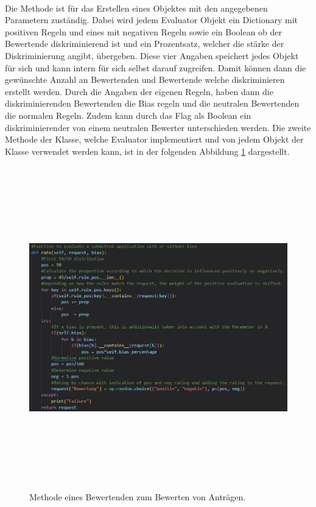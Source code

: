 \begin{onehalfspace}
\begin{figure}[h]
\end{figure}\\
Die Methode ist für das Erstellen eines Objektes mit den angegebenen Parametern zuständig. Dabei wird jedem \glqq{}Evaluator\grqq{} Objekt ein Dictionary mit positiven Regeln und eines mit negativen Regeln sowie ein Boolean ob der Bewertende diskriminierend ist und ein Prozentsatz, welcher die stärke der Diskriminierung angibt, übergeben. Diese vier Angaben speichert jedes Objekt für sich und kann intern für sich selbst darauf zugreifen. Damit können dann die gewünschte Anzahl an Bewertenden und Bewertende welche diskriminieren erstellt werden. Durch die Angaben der eigenen Regeln, haben dann die diskriminierenden Bewertenden die Bias regeln und die neutralen Bewertenden die normalen Regeln. Zudem kann durch das Flag als Boolean ein diskriminierender von einem neutralen Bewerter unterschieden werden.
Die zweite Methode der Klasse, welche \glqq{}Evaluator\grqq{} implementiert und von jedem Objekt der Klasse verwendet werden kann, ist in der folgenden Abbildung \ref{fig:Evaluator_rate} dargestellt.
\begin{figure}[h]
    \centering
    \includegraphics[width=16cm,height=14cm]{Diagramme/Evaluator_Rate.JPG}
    \caption{Methode eines Bewertenden zum Bewerten von Anträgen.}
    \label{fig:Evaluator_rate}

\end{figure}
\end{onehalfspace}
